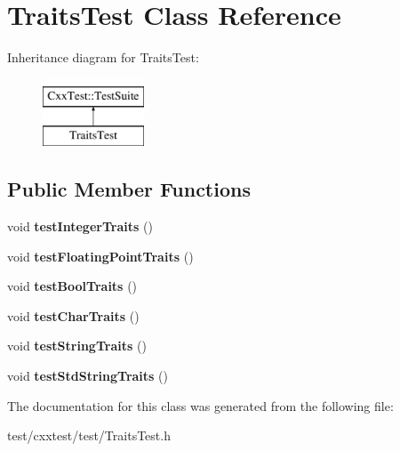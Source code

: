 \hypertarget{classTraitsTest}{\section{Traits\-Test Class Reference}
\label{classTraitsTest}
}
Inheritance diagram for Traits\-Test\-:\begin{figure}[H]
\begin{center}
\leavevmode
\includegraphics[height=2.000000cm]{classTraitsTest}
\end{center}
\end{figure}
\subsection*{Public Member Functions}
\begin{DoxyCompactItemize}
\item 
\hypertarget{classTraitsTest_a1465c32ea7362cfb60a18a0f252d56a3}{void {\bfseries test\-Integer\-Traits} ()}\label{classTraitsTest_a1465c32ea7362cfb60a18a0f252d56a3}

\item 
\hypertarget{classTraitsTest_a45ec213c349ceab70524a58eb6a1d136}{void {\bfseries test\-Floating\-Point\-Traits} ()}\label{classTraitsTest_a45ec213c349ceab70524a58eb6a1d136}

\item 
\hypertarget{classTraitsTest_abe427d81cee3b18334cbe94ed0418db9}{void {\bfseries test\-Bool\-Traits} ()}\label{classTraitsTest_abe427d81cee3b18334cbe94ed0418db9}

\item 
\hypertarget{classTraitsTest_aab27f773726bc3a63ea4b5f1c310c676}{void {\bfseries test\-Char\-Traits} ()}\label{classTraitsTest_aab27f773726bc3a63ea4b5f1c310c676}

\item 
\hypertarget{classTraitsTest_a6ba8e5df07a0dd99acc8029d3f78f17d}{void {\bfseries test\-String\-Traits} ()}\label{classTraitsTest_a6ba8e5df07a0dd99acc8029d3f78f17d}

\item 
\hypertarget{classTraitsTest_aaf08b6a8e5e75aa61ad9ef70fc9a3183}{void {\bfseries test\-Std\-String\-Traits} ()}\label{classTraitsTest_aaf08b6a8e5e75aa61ad9ef70fc9a3183}

\end{DoxyCompactItemize}


The documentation for this class was generated from the following file\-:\begin{DoxyCompactItemize}
\item 
test/cxxtest/test/Traits\-Test.\-h\end{DoxyCompactItemize}
